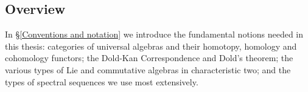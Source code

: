 \documentclass[11pt]{amsart} \renewcommand{\baselinestretch}{1.2}
\theoremstyle{plain}
\numberwithin{equation}{section} %
\theoremstyle{plain}
\numberwithin{equation}{chapter} %
\newcommand{\scrC}{\mathscr{C}}
\newcommand{\calw}{\mathcal{W}}
\newcommand{\calu}{\mathcal{U}}
\newcommand{\F}{\mathbb{F}}
\newcommand{\algs}{{\scrC\!\textit{\normalfont\textit{om}}}}
\newcommand{\Ftwo}{\F_2}
\newcommand{\BKSS}{BKSS}
\newcommand{\SubsectionOrSection}[1]{\subsection{#1}}
\begin{document}
\begin{Introduction}




\SubsectionOrSection{Overview}
In \S\ref{Conventions and notation} we introduce the fundamental notions needed in this thesis: categories of universal algebras and their homotopy, homology and cohomology functors;  the Dold-Kan Correspondence and Dold's theorem; the various types of Lie and commutative algebras in characteristic two; and the types of spectral sequences we use most extensively.




\end{Introduction}
\end{document}
